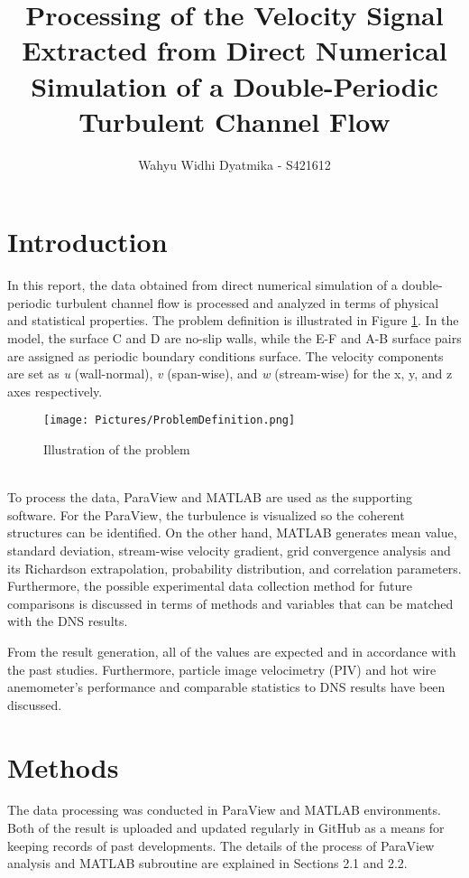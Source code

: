\documentclass[11pt]{article}
\title{\textbf{Processing of the Velocity Signal Extracted from Direct Numerical Simulation of a Double-Periodic Turbulent Channel Flow}}
\author{Wahyu Widhi Dyatmika - S421612}
\date{}
\begin{document}
\maketitle

\section{Introduction}
\label{sc: intro}
In this report, the data obtained from direct numerical simulation of a double-periodic turbulent channel flow is processed and analyzed in terms of physical and statistical properties. The problem definition is illustrated in Figure \ref{fig:probdef}. In the model, the surface C and D are no-slip walls, while the E-F and A-B surface pairs are assigned as periodic boundary conditions surface. The velocity components are set as \textit{u} (wall-normal), \textit{v} (span-wise), and \textit{w} (stream-wise) for the x, y, and z axes respectively. 
\begin{figure}[ht]
    \centering
    \texttt{[image: Pictures/ProblemDefinition.png]}
    \caption{Illustration of the problem~\citep{Józsa2023}}
    \label{fig:probdef}
\end{figure}
\\
To process the data, ParaView and MATLAB are used as the supporting software. For the ParaView, the turbulence is visualized so the coherent structures can be identified. On the other hand, MATLAB generates mean value, standard deviation, stream-wise velocity gradient, grid convergence analysis and its Richardson extrapolation, probability distribution, and correlation parameters. Furthermore, the possible experimental data collection method for future comparisons is discussed in terms of methods and variables that can be matched with the DNS results. \par
\medskip
\noindent From the result generation, all of the values are expected and in accordance with the past studies. Furthermore, particle image velocimetry (PIV) and hot wire anemometer's performance and comparable statistics to DNS results have been discussed.

\section{Methods}
\label{sc: Methods}
The data processing was conducted in ParaView and MATLAB environments. Both of the result is uploaded and updated regularly in GitHub as a means for keeping records of past developments. The details of the process of ParaView analysis and MATLAB subroutine are explained in Sections 2.1 and 2.2.
\end{document}
